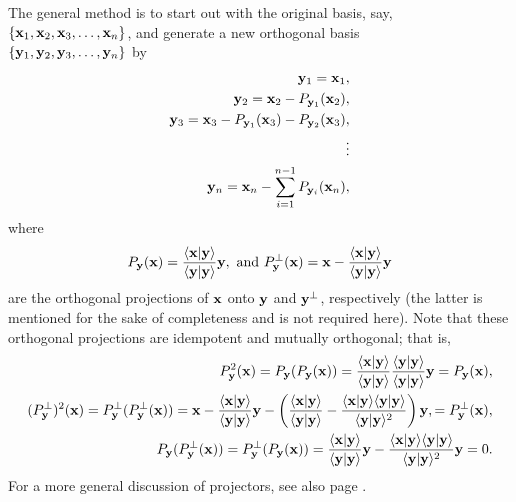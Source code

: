 The general method is to start out with the original basis,
say,  \\
$\{
{\bf x}_1,
{\bf x}_2,
{\bf x}_3,
\ldots ,
{\bf x}_n
\}$,
and generate a new orthogonal basis \\
$\{
{\bf y}_1,
{\bf y}_2,
{\bf y}_3,
\ldots ,
{\bf y}_n
\}$
by
\begin{equation}
\begin{split}
{\bf y}_1={\bf x}_1,\\
{\bf y}_2={\bf x}_2 - P_{{\bf y}_1}({\bf x}_2),\\
{\bf y}_3={\bf x}_3 - P_{{\bf y}_1}({\bf x}_3)- P_{{\bf y}_2}({\bf x}_3),\\
 \vdots \\
{\bf y}_n={\bf x}_n -\sum_{i=1}^{n-1} P_{{\bf y}_i}({\bf x}_n),
\end{split}
\end{equation}
where
\begin{equation}
P_{{\bf y}}({\bf x}) =
\frac{\langle {\bf x}\vert {\bf y} \rangle }
{\langle {\bf y}\vert {\bf y} \rangle }
{\bf y}
,\textrm{ and }
P_{{\bf y}}^\perp ({\bf x}) = {\bf x} -
\frac{\langle {\bf x}\vert {\bf y} \rangle }
{\langle {\bf y}\vert {\bf y} \rangle }
{\bf y}
\end{equation}
are the orthogonal projections of ${\bf x}$ onto ${\bf y}$ and ${\bf y}^\perp$, respectively
(the latter is mentioned for the sake of completeness and is not required here).
\label{2011-m-gsp}
Note that these orthogonal projections are idempotent
and mutually orthogonal; that is,
\begin{equation}
\begin{split}
P_{{\bf y}}^2({\bf x})  = P_{{\bf y}}(P_{{\bf y}}({\bf x}) ) =
\frac{\langle {\bf x}\vert {\bf y} \rangle }
{\langle {\bf y}\vert {\bf y} \rangle }
\frac{\langle {\bf y}\vert {\bf y} \rangle }
{\langle {\bf y}\vert {\bf y} \rangle }
{\bf y} =P_{{\bf y}}({\bf x}),  \\
%
(P_{{\bf y}}^\perp)^2({\bf x})  = P_{{\bf y}}^\perp(P_{{\bf y}}^\perp({\bf x}) ) =
{\bf x}- \frac{\langle {\bf x}\vert {\bf y} \rangle }{\langle {\bf y}\vert {\bf y} \rangle }{\bf y}
-\left(
\frac{\langle {\bf x}\vert {\bf y} \rangle }{\langle {\bf y}\vert {\bf y} \rangle }
-
\frac{\langle {\bf x}\vert {\bf y} \rangle \langle {\bf y}\vert {\bf y}
\rangle}{\langle {\bf y}\vert {\bf y} \rangle^2 }
\right)
{\bf y},
=P_{{\bf y}}^\perp({\bf x}),  \\
P_{{\bf y}}(P_{{\bf y}}^\perp({\bf x}) ) =  P_{{\bf y}}^\perp(P_{{\bf y}}({\bf x}) ) =
\frac{\langle {\bf x}\vert {\bf y} \rangle }{\langle {\bf y}\vert {\bf y} \rangle }{\bf y}
-
\frac{\langle {\bf x}\vert {\bf y} \rangle \langle {\bf y}\vert {\bf y} \rangle}{\langle {\bf y}\vert {\bf y} \rangle^2 }
{\bf y}
=0.
\end{split}
\end{equation}
For a more general discussion of projectors, see also page \pageref{2011-m-projec}.

